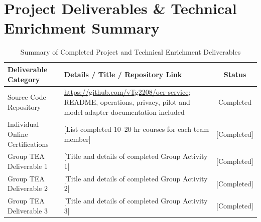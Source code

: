 \documentclass[11pt, a4paper]{article}
\begin{document}
\section{Project Deliverables \& Technical Enrichment Summary}
\begin{table}[H]
    \centering
    \footnotesize
    \renewcommand{\arraystretch}{1.2}
    \begin{tabular}{|p{4.2cm}|p{7.5cm}|c|}
        \hline
        \textbf{Deliverable Category} & \textbf{Details / Title / Repository Link} & \textbf{Status} \\
        \hline
        Source Code Repository & \url{https://github.com/vTg2208/ocr-service}; README, operations, privacy, pilot and model-adapter documentation included & Completed \\
        \hline
        Individual Online Certifications & [List completed 10--20 hr courses for each team member] & [Completed] \\
        \hline
        Group TEA Deliverable 1 & [Title and details of completed Group Activity 1] & [Completed] \\
        \hline
        Group TEA Deliverable 2 & [Title and details of completed Group Activity 2] & [Completed] \\
        \hline
        Group TEA Deliverable 3 & [Title and details of completed Group Activity 3] & [Completed] \\
        \hline
    \end{tabular}
    \caption{Summary of Completed Project and Technical Enrichment Deliverables}
\end{table}

\vspace{0.2cm}
\nocite{*}
\renewcommand{\refname}{\large\bfseries\color{amritaMaroon}References}


\end{document}
